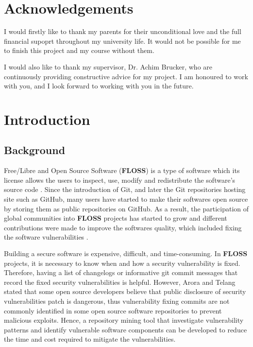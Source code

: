 \documentclass[12pt, a4paper]{report}
\begin{document}
\newpage


\chapter*{Acknowledgements}
I would firstly like to thank my parents for their unconditional love and the full financial supoprt
throughout my university life. It would not be possible for me to finish this project and my course
without them.

I would also like to thank my supervisor, Dr. Achim Brucker, who are continuously providing
constructive advice for my project. I am honoured to work with you, and I look forward to working
with you in the future.

\newpage

\tableofcontents



\newpage


\chapter{Introduction}
\section{Background}
Free/Libre and Open Source Software (\textbf{FLOSS}) is a type of software which its license allows
the users to inspect, use, modify and redistribute the software's source code \cite{crowston_2012}.
Since the introduction of Git, and later the Git repositories hosting site such as GitHub, many
users have started to make their softwares open source by storing them as public repositories on
GitHub. As a result, the participation of global communities into \textbf{FLOSS} projects has
started to grow and different contributions were made to improve the softwares quality, which
included fixing the software vulnerabilities \cite{dabbish_2012}.

Building a secure software is expensive, difficult, and time-consuming. In \textbf{FLOSS} projects,
it is necessary to know when and how a security vulnerability is fixed. Therefore, having a list of
changelogs or informative git commit messages that record the fixed security vulnerabilities is
helpful. However, Arora and Telang \cite{arora_2005} stated that some open source developers believe
that public disclosure of security vulnerabilities patch is dangerous, thus vulnerability fixing
commits are not commonly identified in some open source software repositories to prevent malicious
exploits. Hence, a repository mining tool that investigate vulnerability patterns and identify
vulnerable software components can be developed to reduce the time and cost required to mitigate the
vulnerabilities.
\end{document}
